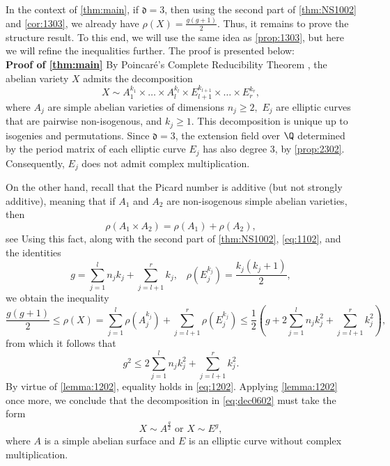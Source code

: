 \documentclass[11pt,leqno]{article}
\theoremstyle{definition}
\begin{document}
In the context of \cref{thm:main}, if $\mathfrak{d}=3$, then using the second part of \cref{thm:NS1002} and \cref{cor:1303}, we already have $\rho(X)=\frac{g(g+1)}{2}$. Thus, it remains to prove the structure result. To this end, we will use the same idea as \cref{prop:1303}, but here we will refine the inequalities further. The proof is presented below:\\



\noindent\textbf{Proof of \cref{thm:main}}
By Poincaré's Complete Reducibility Theorem \cite[Thm. 5.3.7]{birkenhake2004complex}, the abelian variety $X$ admits the decomposition
    \begin{equation}
    \label{eq;dec0602}
        X\sim A_1^{k_1}\times\dots\times A_l^{k_l}\times E_{l+1}^{k_{l+1}}\times\dots\times E_{r}^{k_r},
    \end{equation}
    where $A_j$ are simple abelian varieties of dimensions $n_j\geq 2,$ $E_j$ are elliptic curves that are pairwise non-isogenous, and $k_j\geq 1$. This decomposition is unique up to isogenies and permutations. Since $\mathfrak{d}=3$, the extension field over $\Q$ determined by the period matrix of each elliptic curve $E_j$ has also degree $3$, by \cref{prop:2302}. Consequently, $E_j$ does not admit complex multiplication. 

    On the other hand, recall that the Picard number is additive (but not strongly additive), meaning that if $A_1$ and $A_2$ are non-isogenous simple abelian varieties, then
    $$
    \rho(A_1\times A_2)=\rho(A_1)+\rho(A_2),
    $$
    see \cite[Corollary 2.3]{hulek2019picard} Using this fact, along with the second part of \cref{thm:NS1002}, \cref{eq:1102}, and the identities $$g=\sum_{j=1}^{l}n_jk_j+\sum_{j=l+1}^{r}k_j, \;\;\;\rho(E_j^{k_j})=\frac{k_j(k_j+1)}{2},$$ 
    we obtain the inequality 
\begin{equation*}
    \frac{g(g+1)}{2}\leq\rho(X)=\sum_{j=1}^{l}\rho(A_j^{k_j})+\sum_{j=l+1}^{r}\rho(E_j^{k_j})\leq \frac{1}{2}\left(g+ 2\sum_{j=1}^{l}n_jk_j^2+\sum_{j=l+1}^{r}k_j^2 \right),
    \end{equation*}
from which it follows that
\begin{equation}
\label{eq:1202}
g^2\leq 2\sum_{j=1}^{l}n_jk_j^2+\sum_{j=l+1}^{r}k_j^2.
\end{equation}
By virtue of \cref{lemma:1202}, equality holds in \cref{eq:1202}. Applying \cref{lemma:1202} once more, we conclude that the decomposition in \cref{eq;dec0602} must take the form 
$$
X\sim A^{\frac{g}{2}} \text{ or } X\sim E^{g}, 
$$
where $A$ is a simple abelian surface and $E$ is an elliptic curve without complex multiplication. 
\end{document}
